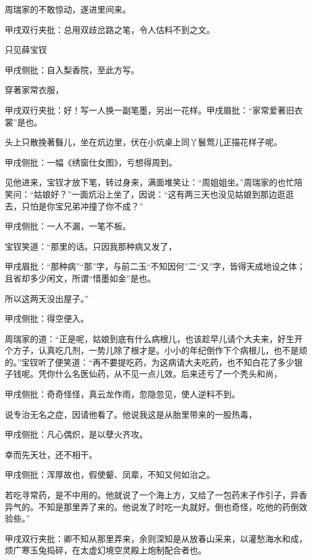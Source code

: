 \begin{parag}
    周瑞家的不敢惊动，遂进里间来。\begin{note}甲戌双行夹批：总用双歧岔路之笔，令人估料不到之文。\end{note}只见薛宝钗\begin{note}甲戌侧批：自入梨香院，至此方写。\end{note}穿著家常衣服，\begin{note}甲戌双行夹批：好！写一人换一副笔墨，另出一花样。甲戌眉批：“家常爱著旧衣裳”是也。\end{note}头上只散挽著䰖儿，坐在炕边里，伏在小炕桌上同丫鬟莺儿正描花样子呢。\begin{note}甲戌侧批：一幅《绣窗仕女图》，亏想得周到。\end{note}见他进来，宝钗才放下笔，转过身来，满面堆笑让：“周姐姐坐。”周瑞家的也忙陪笑问：“姑娘好？”一面炕沿上坐了，因说：“这有两三天也没见姑娘到那边逛逛去，只怕是你宝兄弟冲撞了你不成？”\begin{note}甲戌侧批：一人不漏，一笔不板。\end{note}宝钗笑道：“那里的话。只因我那种病又发了，\begin{note}甲戌眉批：“那种病”“那”字，与前二玉“不知因何”二“又”字，皆得天成地设之体；且省却多少闲文，所谓“惜墨如金”是也。\end{note}所以这两天没出屋子。”\begin{note}甲戌侧批：得空便入。\end{note}周瑞家的道：“正是呢，姑娘到底有什么病根儿，也该趁早儿请个大夫来，好生开个方子，认真吃几剂，一势儿除了根才是。小小的年纪倒作下个病根儿，也不是顽的。”宝钗听了便笑道：“再不要提吃药，为这病请大夫吃药，也不知白花了多少银子钱呢。凭你什么名医仙药，从不见一点儿效。后来还亏了一个秃头和尚，\begin{note}甲戌侧批：奇奇怪怪，真云龙作雨，忽隐忽见，使人逆料不到。\end{note}说专治无名之症，因请他看了。他说我这是从胎里带来的一股热毒，\begin{note}甲戌侧批：凡心偶炽，是以孽火齐攻。\end{note}幸而先天壮，还不相干。\begin{note}甲戌侧批：浑厚故也，假使颦、凤辈，不知又何如治之。\end{note}若吃寻常药，是不中用的。他就说了一个海上方，又给了一包药末子作引子，异香异气的。不知是那里弄了来的。他说发了时吃一丸就好。倒也奇怪，吃他的药倒效验些。”\begin{note}甲戌双行夹批：卿不知从那里弄来，余则深知是从放春山采来，以灌愁海水和成，烦广寒玉兔捣碎，在太虚幻境空灵殿上炮制配合者也。\end{note}
\end{parag}


